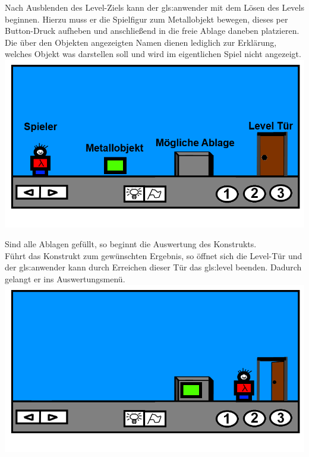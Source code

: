 \documentclass{scrartcl}
\begin{document}
\begin{description}
\begin{enumerate}
		\begin{minipage}{1\textwidth}
			\item \label{Levelaufbau:ErsteSchritte} Nach Ausblenden des Level-Ziels kann der \gls{gls:anwender} mit dem Lösen des Levels beginnen. Hierzu muss er die Spielfigur zum Metallobjekt bewegen, dieses per Button-Druck aufheben und anschließend in die freie Ablage daneben platzieren.\\
			Die über den Objekten angezeigten Namen dienen lediglich zur Erklärung, welches Objekt was darstellen soll und wird im eigentlichen Spiel nicht angezeigt.\\
			\includegraphics[scale=0.5]{assets/Level1mA}
		\end{minipage}
		
		\begin{minipage}{1\textwidth}
			\item \label{Levelaufbau:Levelende} Sind alle Ablagen gefüllt, so beginnt die Auswertung des Konstrukts.\\ Führt das Konstrukt zum gewünschten Ergebnis, so öffnet sich die Level-Tür  und der \gls{gls:anwender} kann durch Erreichen dieser Tür das \gls{gls:level} beenden. Dadurch gelangt er ins Auswertungsmenü.\\
			\includegraphics[scale=0.5]{assets/LevelEnde}
		\end{minipage}
		

\end{enumerate}
\end{description}
\end{document}

